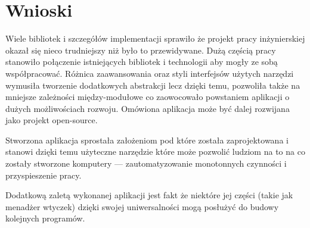 \chapter{Wnioski}
\label{wnioski}

\par
Wiele bibliotek i szczegółów implementacji sprawiło że projekt pracy inżynierskiej okazał się nieco trudniejszy niż było to przewidywane.
Dużą częścią pracy stanowiło połączenie istniejących bibliotek i technologii aby mogły ze sobą współpracować. Różnica zaawansowania oraz styli interfejsów użytych narzędzi wymusiła tworzenie dodatkowych abstrakcji lecz dzięki temu, pozwoliła także na mniejsze zależności między-modułowe co zaowocowało powstaniem aplikacji o dużych możliwościach rozwoju. Omówiona aplikacja może być dalej rozwijana jako projekt open-source.

\par
Stworzona aplikacja sprostała założeniom pod które została zaprojektowana i stanowi dzięki temu użyteczne narzędzie które może pozwolić ludziom na to na co zostały stworzone komputery --- zautomatyzowanie monotonnych czynności i przyspieszenie pracy.

\par
Dodatkową zaletą wykonanej aplikacji jest fakt że niektóre jej części (takie jak menadżer wtyczek) dzięki swojej uniwersalności mogą posłużyć do budowy kolejnych programów.
